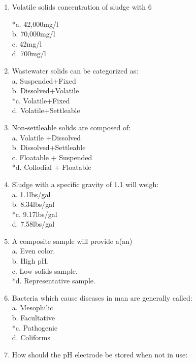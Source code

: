 \begin{enumerate}
\item Volatile solids concentration of sludge with 6%

*a. 42,000mg/l \\
b. 70,000mg/l \\
c. 42mg/l \\
d. 700mg/l 

\item Wastewater solids can be categorized as: \\

a. Suspended+Fixed \\
b. Dissolved+Volatile \\
*c. Volatile+Fixed \\
d. Volatile+Settleable 

\item Non-settleable solids are composed of: \\

a. Volatile +Dissolved \\
b. Dissolved+Settleable \\
c. Floatable + Suspended \\
*d. Collodial + Floatable 

\item Sludge with a specific gravity of 1.1 will weigh: \\

a. 1.1lbs/gal \\
b. 8.34lbs/gal \\
*c. 9.17lbs/gal \\
d. 7.58lbs/gal 



\item  A composite sample will provide a(an) \\

a. Even color. \\
b. High pH. \\
c. Low solids sample. \\
*d. Representative sample. 

\item  Bacteria which cause diseases in man are generally called: \\

a. Mesophilic \\
b. Facultative \\
*c. Pathogenic \\
d. Coliforms 

\item  How should the pH electrode be stored when not in use: \\


\end{enumerate}
